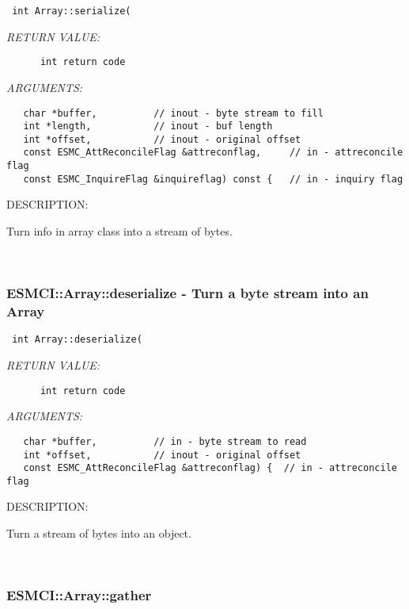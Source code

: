   
\begin{verbatim} int Array::serialize(\end{verbatim}{\em RETURN VALUE:}
\begin{verbatim}      int return code\end{verbatim}{\em ARGUMENTS:}
\begin{verbatim}   char *buffer,          // inout - byte stream to fill
   int *length,           // inout - buf length
   int *offset,           // inout - original offset
   const ESMC_AttReconcileFlag &attreconflag,     // in - attreconcile flag
   const ESMC_InquireFlag &inquireflag) const {   // in - inquiry flag\end{verbatim}
{\sf DESCRIPTION:\\ }


      Turn info in array class into a stream of bytes.
   
 
\mbox{}\hrulefill\
 
\subsubsection [ESMCI::Array::deserialize] {ESMCI::Array::deserialize - Turn a byte stream into an Array}


  
\begin{verbatim} int Array::deserialize(\end{verbatim}{\em RETURN VALUE:}
\begin{verbatim}      int return code\end{verbatim}{\em ARGUMENTS:}
\begin{verbatim}   char *buffer,          // in - byte stream to read
   int *offset,           // inout - original offset
   const ESMC_AttReconcileFlag &attreconflag) {  // in - attreconcile flag\end{verbatim}
{\sf DESCRIPTION:\\ }


      Turn a stream of bytes into an object.
   
 
\mbox{}\hrulefill\
 
\subsubsection [ESMCI::Array::gather] {ESMCI::Array::gather}


